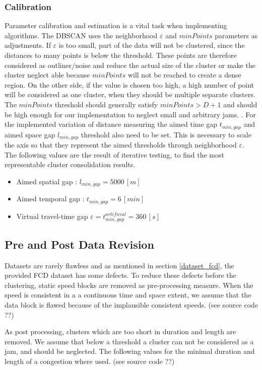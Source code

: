 \subsubsection{Calibration}
Parameter calibration and estimation is a vital task when implementing algorithms. The DBSCAN uses the neighborhood $\varepsilon$ and $minPoints$ parameters as adjustments. If $\varepsilon$ is too small, part of the data will not be clustered, since the distances to many points is below the threshold. These points are therefore considered as outliner/noise and reduce the actual size of the cluster or make the cluster neglect able because $minPoints$ will not be reached to create a dense region. On the other side, if the value is chosen too high, a high number of point will be considered as one cluster, when they should be multiple separate clusters. The $minPoints$ threshold should generally satisfy $minPoints > D + 1$ and should be high enough for our implementation to neglect small and arbitrary jams. \parencite{Padro2017}. For the implemented variation of distance measuring the aimed time gap $t_{min,gap}$ and aimed space gap $l_{min,gap}$ threshold also need to be set. This is necessary to scale the axis so that they represent the aimed thresholds through neighborhood $\varepsilon$. The following values are the result of iterative testing, to find the most representable cluster consolidation results. 

\begin{itemize}
	\item Aimed spatial gap : $l_{min,gap} = 5000 \, [m]$
	\item Aimed temporal gap : $t_{min,gap} = 6 \, [min]$
	\item Virtual travel-time gap $\varepsilon = t_{min,gap}^{artificial} = 360 \, [s]$
\end{itemize}

\subsection{Pre and Post Data Revision}
Datasets are rarely flawless and as mentioned in section \ref{dataset_fcd}, the provided FCD dataset has some defects. To reduce these defects before the clustering, static speed blocks are removed as pre-processing measure. When the speed is consistent in a a continuous time and space extent, we assume that the data block is flawed because of the implausible consistent speeds. (see source code ??) 

As post processing, clusters which are too short in duration and length are removed. We assume that below a threshold a cluster can not be considered as a jam, and should be neglected. The following values for the minimal duration and length of a congestion where used. (see source code ??)


